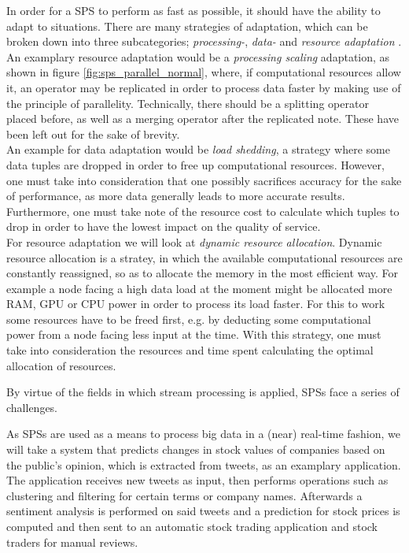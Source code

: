         \quad In order for a SPS to perform as fast as possible, it should have the ability to adapt to situations.
        There are many strategies of adaptation, which can be broken down into three subcategories; \textit{processing-}, \textit{data-} and 
        \textit{resource adaptation} \cite[p.8 f.]{QIN20191}. 
        An examplary resource adaptation would be a \textit{processing scaling} adaptation, as shown in figure \ref{fig:sps_parallel_normal}, 
        where, if computational resources allow it, an operator may be replicated in order to process data faster by
        making use of the principle of parallelity. Technically, there should be a splitting operator placed before, 
        as well as a merging operator after the replicated note. These have been left out for the sake of brevity.
        \\
        An example for data adaptation would be \textit{load shedding}, a strategy where some data tuples are dropped in order to free up computational resources.
        However, one must take into consideration that one possibly sacrifices accuracy for the sake of performance, as more data generally leads to more accurate results.
        Furthermore, one must take note of the resource cost to calculate which tuples to drop in order to have the lowest impact on the quality of service.
        \\
        For resource adaptation we will look at \textit{dynamic resource allocation}. Dynamic resource allocation is a stratey, in which the available computational 
        resources are constantly reassigned, so as to allocate the memory in the most efficient way. For example a node facing a high data load at the moment might 
        be allocated more RAM, GPU or CPU power in order to process its load faster. For this to work some resources have to be freed first, e.g. by deducting some
        computational power from a node facing less input at the time. With this strategy, one must take into consideration the resources and time spent calculating 
        the optimal allocation of resources.

        \quad By virtue of the fields in which stream processing is applied, SPSs face a series of challenges.
        
        \quad As SPSs are used as a means to process big data in a (near) real-time fashion, we will take a system that predicts changes in stock values 
        of companies based on the public's opinion, which is extracted from tweets, as an examplary application.
        \\
        The application receives new \gls{tweet}s as input, then performs operations such as clustering and filtering for certain terms or company names. 
        Afterwards a sentiment analysis is performed on said tweets and a prediction for stock prices is computed and then sent 
        to an automatic stock trading application and stock traders for manual reviews.


